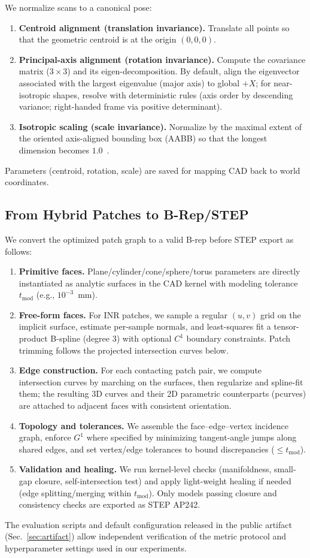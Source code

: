 \documentclass{ieeeaccess}
\begin{document}
We normalize scans to a canonical pose:
\begin{enumerate}
  \item \textbf{Centroid alignment (translation invariance).} Translate all points so that the geometric centroid is at the origin \((0,0,0)\).
  \item \textbf{Principal-axis alignment (rotation invariance).} Compute the covariance matrix (\(3\times 3\)) and its eigen-decomposition. By default, align the eigenvector associated with the largest eigenvalue (major axis) to global \(+X\); for near-isotropic shapes, resolve with deterministic rules (axis order by descending variance; right-handed frame via positive determinant).
  \item \textbf{Isotropic scaling (scale invariance).} Normalize by the maximal extent of the oriented axis-aligned bounding box (AABB) so that the longest dimension becomes \(1.0\)~.
\end{enumerate}
Parameters (centroid, rotation, scale) are saved for mapping CAD back to world coordinates.

\subsection{From Hybrid Patches to B-Rep/STEP}
\label{sec:brep_export}
We convert the optimized patch graph to a valid B-rep before STEP export as follows:
\begin{enumerate}
  \item \textbf{Primitive faces.} Plane/cylinder/cone/sphere/torus parameters are directly instantiated as analytic surfaces in the CAD kernel with modeling tolerance $t_{\mathrm{mod}}$ (e.g., $10^{-3}$~mm).
  \item \textbf{Free-form faces.} For INR patches, we sample a regular $(u,v)$ grid on the implicit surface, estimate per-sample normals, and least-squares fit a tensor-product B-spline (degree 3) with optional $C^1$ boundary constraints. Patch trimming follows the projected intersection curves below.
  \item \textbf{Edge construction.} For each contacting patch pair, we compute intersection curves by marching on the surfaces, then regularize and spline-fit them; the resulting 3D curves and their 2D parametric counterparts (pcurves) are attached to adjacent faces with consistent orientation.
  \item \textbf{Topology and tolerances.} We assemble the face–edge–vertex incidence graph, enforce $G^1$ where specified by minimizing tangent-angle jumps along shared edges, and set vertex/edge tolerances to bound discrepancies ($\le t_{\mathrm{mod}}$).
  \item \textbf{Validation and healing.} We run kernel-level checks (manifoldness, small-gap closure, self-intersection test) and apply light-weight healing if needed (edge splitting/merging within $t_{\mathrm{mod}}$). Only models passing closure and consistency checks are exported as STEP AP242.
\end{enumerate}
The evaluation scripts and default configuration released in the public artifact (Sec.~\ref{sec:artifact}) allow independent verification of the metric protocol and hyperparameter settings used in our experiments.
\end{document}
